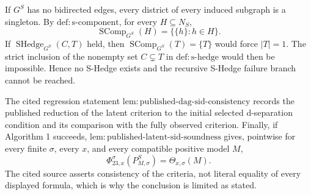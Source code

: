If \(G^S\) has no bidirected edges, every district of every induced subgraph is a singleton. By \(\mathrm{def:s\text{-}component}\), for every \(H\subseteq N_S\),
\[
 \operatorname{SComp}_{G^S}(H)=\{\{h\}:h\in H\}.
\]
If \(\operatorname{SHedge}_{G^S}(C,T)\) held, then \(\operatorname{SComp}_{G^S}(T)=\{T\}\) would force \(|T|=1\). The strict inclusion of the nonempty set \(C\subsetneq T\) in \(\mathrm{def:s\text{-}hedge}\) would then be impossible. Hence no S-Hedge exists and the recursive S-Hedge failure branch cannot be reached.

The cited regression statement \(\mathrm{lem:published\text{-}dag\text{-}sid\text{-}consistency}\) records the published reduction of the latent criterion to the initial selected d-separation condition and its comparison with the fully observed criterion. Finally, if Algorithm 1 succeeds, \(\mathrm{lem:published\text{-}latent\text{-}sid\text{-}soundness}\) gives, pointwise for every finite \(\sigma\), every \(x\), and every compatible positive model \(M\),
\[
 \Phi_{23,x}^{\sigma}(P_{M,\sigma}^S)=\Theta_{x,\sigma}(M).
\]
The cited source asserts consistency of the criteria, not literal equality of every displayed formula, which is why the conclusion is limited as stated.